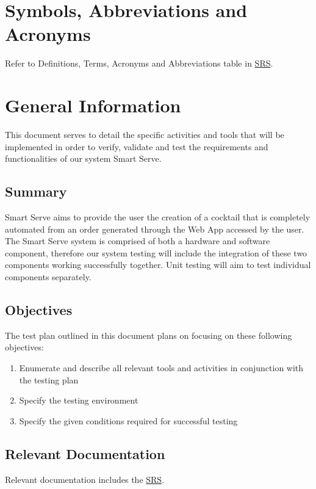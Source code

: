 \documentclass[12pt, titlepage]{article}
\begin{document}
\newpage

\section{Symbols, Abbreviations and Acronyms}

Refer to Definitions, Terms, Acronyms and Abbreviations table in \href{https://github.com/purefisher/Smart-Serve/blob/main/docs/SRS/SRS.pdf}{SRS}.
\newpage


\section{General Information}
This document serves to detail the specific activities and tools that will be implemented in order to verify, validate and test the requirements and functionalities of our system Smart Serve.  



\subsection{Summary}
Smart Serve aims to provide the user the creation of a cocktail that is completely automated from an order generated through the Web App accessed by the user. The Smart Serve system is comprised of both a hardware and software component, therefore our system testing will include the integration of these two components working successfully together. Unit testing will aim to test individual components separately. 

\subsection{Objectives}
The test plan outlined in this document plans on focusing on these following objectives:
\begin{enumerate}
    \item Enumerate and describe all relevant tools and activities in conjunction with the testing plan 
    \item Specify the testing environment 
    \item Specify the given conditions required for successful testing
    
\end{enumerate}

\subsection{Relevant Documentation}
Relevant documentation includes the \href{https://github.com/purefisher/Smart-Serve/blob/main/docs/SRS/SRS.pdf}{SRS}. 
\end{document}
